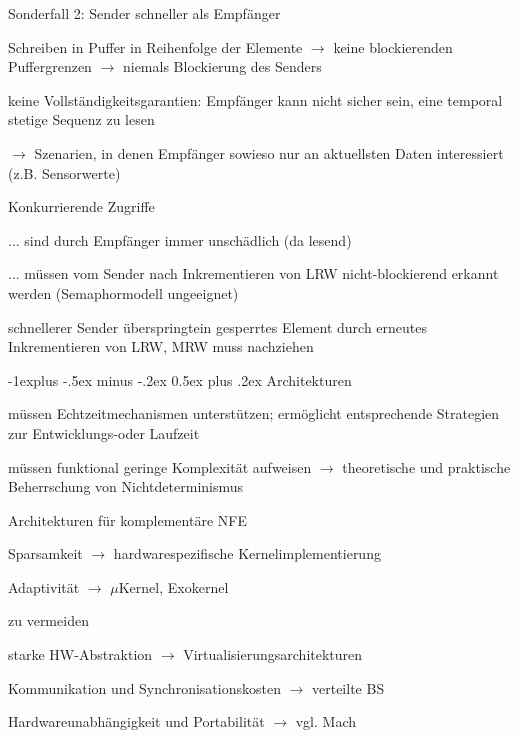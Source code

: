 \documentclass[a4paper]{article}
\makeatletter
\renewcommand{\subsection}{\@startsection{subsection}{2}{0mm}%
 {-1explus -.5ex minus -.2ex}%
 {0.5ex plus .2ex}%
 {\normalfont\normalsize\bfseries}}
\makeatother
\begin{document}
\begin{multicols}{3}
    Sonderfall 2: Sender schneller als Empfänger
    \begin{itemize*}
        \item Schreiben in Puffer in Reihenfolge der Elemente $\rightarrow$ keine blockierenden Puffergrenzen $\rightarrow$ niemals Blockierung des Senders
        \item keine Vollständigkeitsgarantien: Empfänger kann nicht sicher sein, eine temporal stetige Sequenz zu lesen
        \item[$\rightarrow$] Szenarien, in denen Empfänger sowieso nur an aktuellsten Daten interessiert (z.B. Sensorwerte)
    \end{itemize*}

    Konkurrierende Zugriffe
    \begin{itemize*}
        \item ... sind durch Empfänger immer unschädlich (da lesend)
        \item ... müssen vom Sender nach Inkrementieren von LRW nicht-blockierend erkannt werden (Semaphormodell ungeeignet)
        \item schnellerer Sender überspringtein gesperrtes Element durch erneutes Inkrementieren von LRW, MRW muss nachziehen
    \end{itemize*}

    \subsection{Architekturen}
    \begin{itemize*}
        \item müssen Echtzeitmechanismen unterstützen; ermöglicht entsprechende Strategien zur Entwicklungs-oder Laufzeit
        \item müssen funktional geringe Komplexität aufweisen $\rightarrow$ theoretische und praktische Beherrschung von Nichtdeterminismus
        \item Architekturen für komplementäre NFE
        \begin{itemize*}
            \item Sparsamkeit $\rightarrow$ hardwarespezifische Kernelimplementierung
            \item Adaptivität $\rightarrow$ $\mu$Kernel, Exokernel
        \end{itemize*}
        \item zu vermeiden
        \begin{itemize*}
            \item starke HW-Abstraktion $\rightarrow$ Virtualisierungsarchitekturen
            \item Kommunikation und Synchronisationskosten $\rightarrow$ verteilte BS
            \item Hardwareunabhängigkeit und Portabilität $\rightarrow$ vgl. Mach
        \end{itemize*}
    \end{itemize*}


\end{multicols}
\end{document}
